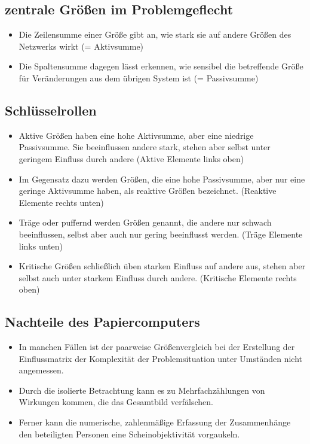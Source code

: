 \documentclass[a4paper,12pt]{scrartcl}
\begin{document}
\subsection{zentrale Größen im Problemgeflecht}
\begin{itemize}
\item Die Zeilensumme einer Größe gibt an, wie stark sie auf andere Größen des Netzwerks wirkt (= Aktivsumme)
\item Die Spaltensumme dagegen lässt erkennen, wie sensibel die betreffende Größe für Veränderungen aus dem übrigen System ist (= Passivsumme)
\end{itemize}

\subsection{Schlüsselrollen}
\begin{itemize}
\item Aktive Größen haben eine hohe Aktivsumme, aber eine niedrige Passivsumme. Sie beeinflussen andere stark, stehen aber selbst unter geringem Einfluss durch andere (Aktive Elemente links oben)
\item  Im Gegensatz dazu werden Größen, die eine hohe Passivsumme, aber nur eine geringe Aktivsumme haben, als reaktive Größen bezeichnet. (Reaktive Elemente rechts unten)
\item Träge oder puffernd werden Größen genannt, die andere nur schwach beeinflussen, selbst aber auch nur gering beeinflusst werden. (Träge Elemente links unten)
\item  Kritische Größen schließlich üben starken Einfluss auf andere aus, stehen aber selbst auch unter starkem Einfluss durch andere. (Kritische Elemente rechts oben)
\end{itemize}

\subsection{Nachteile des Papiercomputers}
\begin{itemize}
\item In manchen Fällen ist der paarweise Größenvergleich bei der Erstellung der Einflussmatrix der Komplexität der Problemsituation unter Umständen nicht angemessen.
\item Durch die isolierte Betrachtung kann es zu Mehrfachzählungen von Wirkungen kommen, die das Gesamtbild verfälschen.
\item Ferner kann die numerische, zahlenmäßige Erfassung der Zusammenhänge den beteiligten Personen eine Scheinobjektivität vorgaukeln.
\end{itemize}
\end{document}
